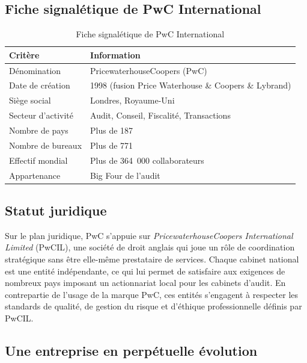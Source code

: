 \documentclass[12pt,a4paper,twoside]{report}
\begin{document}
\subsection{Fiche signalétique de PwC International}

\begin{table}[H]
\centering
\caption{Fiche signalétique de PwC International}
\label{tab:fiche_pwc_intl}
\begin{tabular}{ll}
\toprule
\textbf{Critère}              & \textbf{Information} \\
\midrule
Dénomination                  & PricewaterhouseCoopers (PwC) \\
Date de création              & 1998 (fusion Price Waterhouse \& Coopers \& Lybrand) \\
Siège social                  & Londres, Royaume-Uni \\
Secteur d'activité            & Audit, Conseil, Fiscalité, Transactions \\
Nombre de pays                & Plus de 187 \\
Nombre de bureaux             & Plus de 771 \\
Effectif mondial              & Plus de 364~000 collaborateurs \\
Appartenance                  & Big Four de l'audit \\
\bottomrule
\end{tabular}
\end{table}

\subsection{Statut juridique}

Sur le plan juridique, PwC s'appuie sur \textit{PricewaterhouseCoopers International Limited} (PwCIL), une société de droit anglais qui joue un rôle de coordination stratégique sans être elle-même prestataire de services. Chaque cabinet national est une entité indépendante, ce qui lui permet de satisfaire aux exigences de nombreux pays imposant un actionnariat local pour les cabinets d'audit. En contrepartie de l'usage de la marque PwC, ces entités s'engagent à respecter les standards de qualité, de gestion du risque et d'éthique professionnelle définis par PwCIL.

\subsection{Une entreprise en perpétuelle évolution}
\end{document}
